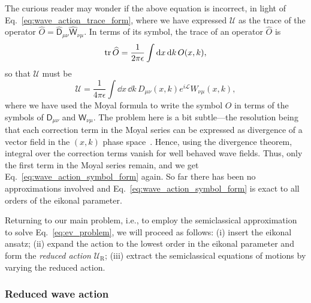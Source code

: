 The curious reader may wonder if the above equation is incorrect, in light of Eq.~\eqref{eq:wave_action_trace_form}, where we have expressed $\mathscr{U}$ as the trace of the operator $\widehat{O} = \widehat{\mathsf{D}}_{\mu\nu}\widehat{\mathsf{W}}_{\nu\mu}$.
In terms of its symbol, the trace of an operator $\widehat{O}$ is
%
\begin{equation}
  \operatorname{tr}\widehat{O} = \frac{1}{2\pi\epsilon} \int \mathrm{d}{x}\,\mathrm{d}{k}\, O(x, k),
\end{equation}
%
so that $\mathscr{U}$ must be
%
\begin{equation}
  \mathscr{U} = \frac{1}{4\pi\epsilon}\int \dd{x}\,\dd{k}\, D_{\mu\nu}(x,k)e^{i\mathcal{L}}W_{\nu\mu}(x, k),
\end{equation}
%
where we have used the Moyal formula to write the symbol $O$ in terms of the symbols of $\mathsf{D}_{\mu\nu}$ and $\mathsf{W}_{\nu\mu}$.
The problem here is a bit subtle---the resolution being that each correction term in the Moyal series can be expressed as divergence of a vector field in the $(x, k)$ phase space~\cite[Problem 3.16]{tracy2014}.
Hence, using the divergence theorem, integral over the correction terms vanish for well behaved wave fields.
Thus, only the first term in the Moyal series remain, and we get Eq.~\eqref{eq:wave_action_symbol_form} again.
So far there has been no approximations involved and Eq.~\eqref{eq:wave_action_symbol_form} is exact to all orders of the eikonal parameter.

Returning to our main problem, i.e., to employ the semiclassical approximation to solve Eq.~\eqref{eq:ev_problem}, we will proceed as follows: (i) insert the eikonal ansatz; (ii) expand the action to the lowest order in the eikonal parameter and form the \emph{reduced action} $\mathscr{U}_{\text{R}}$; (iii) extract the semiclassical equations of motions by varying the reduced action.

\subsubsection*{Reduced wave action}

